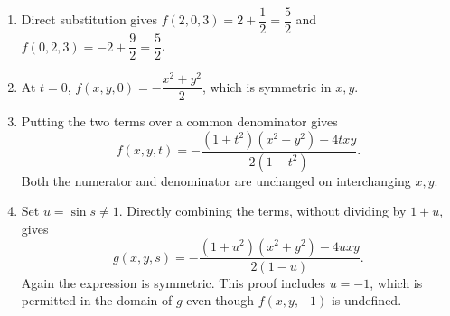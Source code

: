 \begin{enumerate}
\item Direct substitution gives $f(2,0,3)=2+\dfrac{1}{2}=\boxed{\dfrac{5}{2}}$ and $f(0,2,3)=-2+\dfrac{9}{2}=\boxed{\dfrac{5}{2}}$.
\item At $t=0$, $f(x,y,0)=-\dfrac{x^2+y^2}{2}$, which is symmetric in $x,y$.
\item Putting the two terms over a common denominator gives
\[
f(x,y,t)=-\dfrac{(1+t^2)(x^2+y^2)-4txy}{2(1-t^2)}.
\]
Both the numerator and denominator are unchanged on interchanging $x,y$.
\item Set $u=\sin s\ne1$. Directly combining the terms, without dividing by $1+u$, gives
\[
g(x,y,s)=-\dfrac{(1+u^2)(x^2+y^2)-4uxy}{2(1-u)}.
\]
Again the expression is symmetric. This proof includes $u=-1$, which is permitted in the domain of $g$ even though $f(x,y,-1)$ is undefined.
\end{enumerate}
